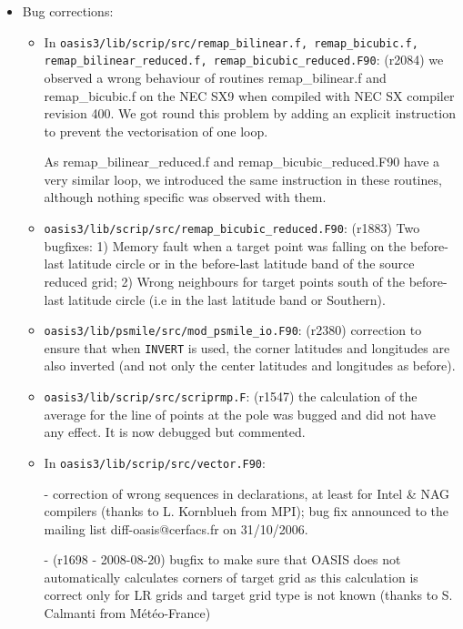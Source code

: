 \begin{itemize}

\item Bug corrections:

  \begin{itemize}

  \item In {\tt oasis3/lib/scrip/src/remap\_bilinear.f, remap\_bicubic.f,
      \break remap\_bilinear\_reduced.f, remap\_bicubic\_reduced.F90}:
    (r2084) we observed a wrong behaviour of routines
    remap\_bilinear.f and remap\_bicubic.f on the NEC SX9 when
    compiled with NEC SX compiler revision 400. We got round this
    problem by adding an explicit instruction to prevent the
    vectorisation of one loop.

    As remap\_bilinear\_reduced.f and remap\_bicubic\_reduced.F90 have
    a very similar loop, we introduced the same instruction in these
    routines, although nothing specific was observed with them.
  
  \item {\tt oasis3/lib/scrip/src/remap\_bicubic\_reduced.F90}:
    (r1883) Two bugfixes: 1) Memory fault when a target point was falling on the
    before-last latitude circle or in the before-last latitude band of
    the source reduced grid; 2) Wrong neighbours for target points
    south of the before-last latitude circle (i.e in the last latitude
    band or Southern).
 
  \item {\tt oasis3/lib/psmile/src/mod\_psmile\_io.F90}: (r2380)
    correction to ensure that when {\tt INVERT} is used, the corner
    latitudes and longitudes are also inverted (and not only the
    center latitudes and longitudes as before).

  \item {\tt oasis3/lib/scrip/src/scriprmp.F}: (r1547) the calculation
    of the average for the line of points at the pole was bugged and
    did not have any effect. It is now debugged but commented.

  \item In {\tt oasis3/lib/scrip/src/vector.F90}: 
    
    - correction of
    wrong sequences in declarations, at least for Intel \& NAG
    compilers (thanks to L. Kornblueh from MPI); bug fix announced to
    the mailing list diff-oasis@cerfacs.fr on 31/10/2006.
    
    - (r1698 - 2008-08-20) bugfix to
    make sure that OASIS does not automatically calculates corners of
    target grid as this calculation is correct only for LR grids and target
    grid type is not known (thanks to S. Calmanti from
    M\'et\'eo-France)
    

\end{itemize}
\end{itemize}
